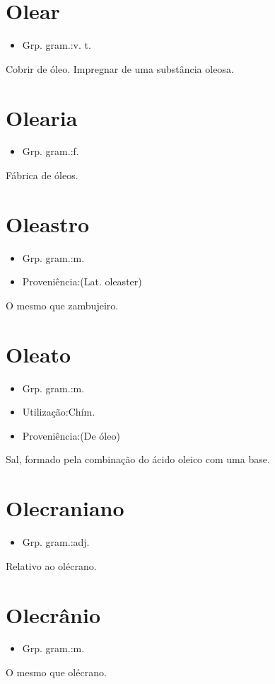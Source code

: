 \section{Olear}
\begin{itemize}
\item {Grp. gram.:v. t.}
\end{itemize}
Cobrir de óleo.
Impregnar de uma substância oleosa.
\section{Olearia}
\begin{itemize}
\item {Grp. gram.:f.}
\end{itemize}
Fábrica de óleos.
\section{Oleastro}
\begin{itemize}
\item {Grp. gram.:m.}
\end{itemize}
\begin{itemize}
\item {Proveniência:(Lat. \textunderscore oleaster\textunderscore )}
\end{itemize}
O mesmo que \textunderscore zambujeiro\textunderscore .
\section{Oleato}
\begin{itemize}
\item {Grp. gram.:m.}
\end{itemize}
\begin{itemize}
\item {Utilização:Chím.}
\end{itemize}
\begin{itemize}
\item {Proveniência:(De \textunderscore óleo\textunderscore )}
\end{itemize}
Sal, formado pela combinação do ácido oleico com uma base.
\section{Olecraniano}
\begin{itemize}
\item {Grp. gram.:adj.}
\end{itemize}
Relativo ao olécrano.
\section{Olecrânio}
\begin{itemize}
\item {Grp. gram.:m.}
\end{itemize}
O mesmo que \textunderscore olécrano\textunderscore .
